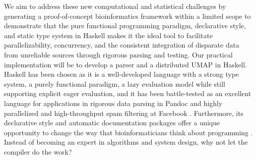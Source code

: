 \documentclass[10pt,letterpaper]{article}
\begin{document}
\begin{multicols}{2}

We aim to address these new computational and statistical challenges
by generating a proof-of-concept bioinformatics framework within a
limited scope to demonstrate that the pure functional programming
paradigm, declarative style, and static type system in Haskell makes
it the ideal tool to facilitate parallelizability, concurrency, and
the consistent integration of disparate data from unreliable sources
through rigorous parsing and testing. Our practical implementation
will be to develop a parser and a distributed UMAP in Haskell. Haskell
has been chosen as it is a well-developed language with a strong type
system, a purely functional paradigm, a lazy evaluation model while
still supporting explicit eager evaluation, and it has been
battle-tested as an excellent language for applications in rigorous
data parsing in Pandoc \parencite{krijnen2014expand} and highly
parallelized and high-throughput spam filtering at Facebook
\parencites{fbFightingSpam,arvidsson2014actors}. Furthermore, its
declarative style and automatic documentation packages offer a unique
opportunity to change the way that bioinformaticians think about
programming \parencite{marlow2002haddock}. Instead of becoming an
expert in algorithms and system design, why not let the compiler do
the work?



\end{multicols}
\end{document}
